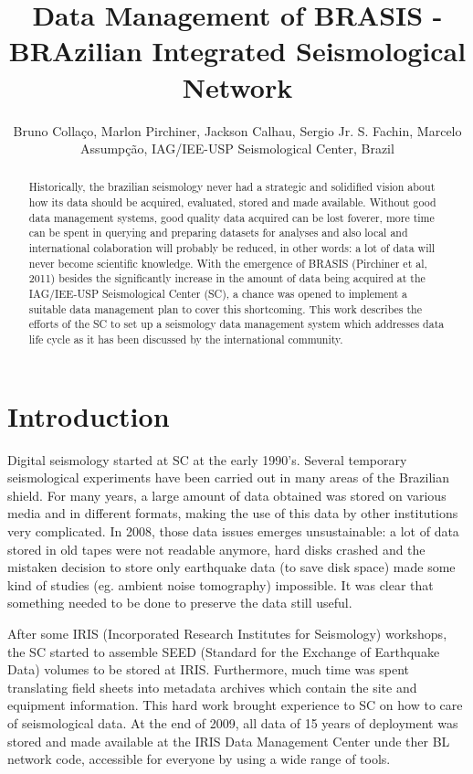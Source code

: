 \documentclass[twoside,letterpaper,twocolumn]{article}
\title{Data Management of BRASIS -
BRAzilian Integrated Seismological Network}
\author{Bruno Colla\c{c}o, Marlon Pirchiner, Jackson Calhau, Sergio Jr. S. Fachin, Marcelo
Assump\c{c}\~{a}o, IAG/IEE-USP Seismological Center, Brazil}
\begin{document}
\maketitle

\begin{abstract}

Historically, the brazilian seismology never had a strategic and solidified vision about how its data should be acquired, evaluated, stored and made available. Without good data management systems, good quality data acquired can be lost foverer, more time can be spent in querying and preparing datasets for analyses and also local and international colaboration will probably be reduced, in other words: a lot of data will never become scientific knowledge. With the emergence of BRASIS (Pirchiner et al, 2011) besides the significantly increase in the amount of data being acquired at the IAG/IEE-USP Seismological Center (SC), a chance was opened to implement a suitable data management plan to cover this shortcoming. This work describes the efforts of the SC to set up a seismology data management system which addresses data life cycle as it has been discussed by the international community.

\end{abstract}

\section{Introduction}

Digital seismology started at SC at the early 1990's. Several temporary seismological experiments have been carried out in many areas of the Brazilian shield. For many years, a large amount of data obtained was stored on various media and in different formats, making the use of this data by other institutions very complicated. In 2008, those data issues emerges unsustainable: a lot of data stored in old tapes were not readable anymore, hard disks crashed and the mistaken decision to store only earthquake data (to save disk space) made some kind of studies (eg. ambient noise tomography) impossible. It was clear that something needed to be done to preserve the data still useful. 

After some IRIS (Incorporated Research Institutes for Seismology) workshops, the SC started to assemble SEED (Standard for the Exchange of Earthquake Data) volumes to be stored at IRIS. Furthermore, much time was spent translating field sheets into metadata archives which contain the site and equipment information. This hard work brought experience to SC on how to care of seismological data. At the end of 2009, all data of 15 years of deployment was stored and made available at the IRIS Data Management Center unde ther BL network code, accessible for everyone by using a wide range of tools.
\end{document}
